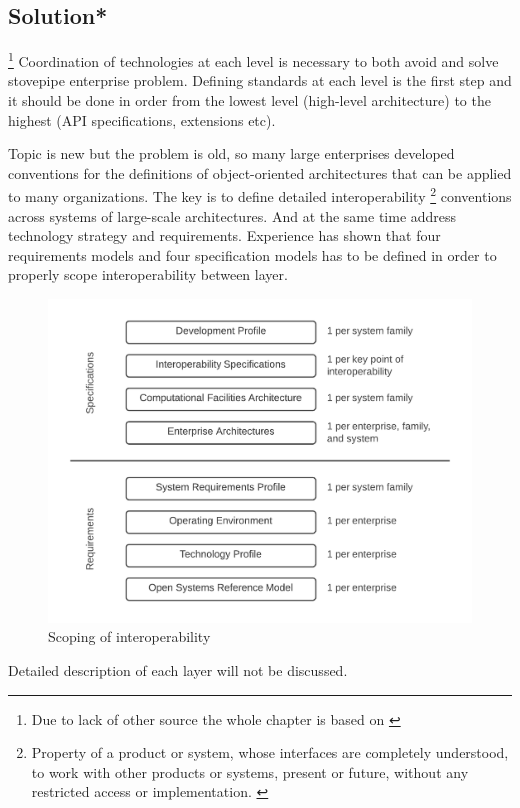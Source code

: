 \newpage
\subsection[Solution]{Solution*}

\footnote{Due to lack of other source the whole chapter is based on \cite{SurvivalGuide}}
Coordination of technologies at each level is necessary to both avoid and solve stovepipe enterprise problem. Defining standards at each level is the first step and it should be done in order from the lowest level (high-level architecture) to the highest (API specifications, extensions etc).

Topic is new but the problem is old, so many large enterprises developed conventions for the definitions of object-oriented architectures that can be applied to many organizations. The key is to define detailed interoperability \footnote{Property of a product or system, whose interfaces are completely understood, to work with other products or systems, present or future, without any restricted access or implementation. \cite{Interoperability}} conventions across systems of large-scale architectures. And at the same time address technology strategy and requirements. Experience has shown that four requirements models and four specification models has to be defined in order to properly scope interoperability between layer.

\begin{figure}[!h]
    \centering
    \includegraphics[scale=0.3]{Images/enterprisesolution.png}
    \caption[Scoping of interoperability]{Scoping of interoperability \cite{SurvivalGuide}}
    \label{fig:ScopingOfInteroperability}
\end{figure}
Detailed description of each layer will not be discussed.

